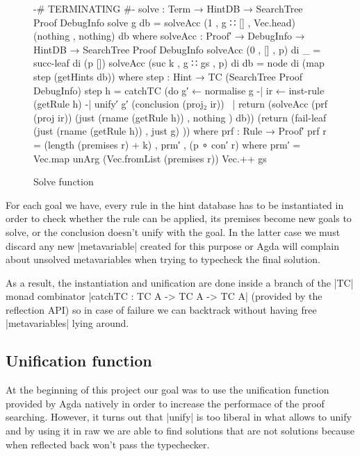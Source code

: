 \documentclass[a4paper]{article}
\begin{document}
\begin{figure}[h]
\small
\begin{code}
  {-# TERMINATING #-}
  solve : Term → HintDB → SearchTree Proof DebugInfo
  solve g db = solveAcc (1 , g ∷ [] , Vec.head) (nothing , nothing) db
    where
      solveAcc : Proof′ → DebugInfo → HintDB → SearchTree Proof DebugInfo
      solveAcc (0     ,     [] , p) di _  = succ-leaf di (p [])
      solveAcc (suc k , g ∷ gs , p) di db = node di (map step (getHints db))
        where
          step : Hint → TC (SearchTree Proof DebugInfo)
          step h = catchTC (do g′  ← normalise g
                            -| ir  ← inst-rule (getRule h)
                            -| unify′ g′ (conclusion (proj₂ ir))
                            ~| return (solveAcc (prf (proj ir)) (just (rname (getRule h)) , nothing ) db))
                            (return (fail-leaf (just (rname (getRule h)) , just g) ))
            where
              prf : Rule → Proof′
              prf r = (length (premises r) + k) , prm′ , (p ∘ con′ r)
                where
                  prm′ = Vec.map unArg (Vec.fromList (premises r))
                          Vec.++ gs
\end{code}
  \label{fig:tree}
  \caption{Solve function}
\end{figure}

For each goal we have, every rule in the hint database has to be instantiated in
order to check whether the rule can be applied, its premises become new goals to
solve, or the conclusion doesn't unify with the goal. In the latter case we must
discard any new |metavariable| created for this purpose or Agda will complain
about unsolved metavariables when trying to typecheck the final solution.

As a result, the instantiation and unification are done inside a branch of the
|TC| monad combinator |catchTC : TC A -> TC A -> TC A| (provided by the
reflection API) so in case of failure we can backtrack without having
free |metavariables| lying around.

\subsection{Unification function}

At the beginning of this project our goal was to use the unification function
provided by Agda natively in order to increase the performace of the proof
searching. However, it turns out that |unify| is too liberal in what allows to
unify and by using it in raw we are able to find solutions that are not
solutions because when reflected back won't pass the typechecker.
\end{document}
